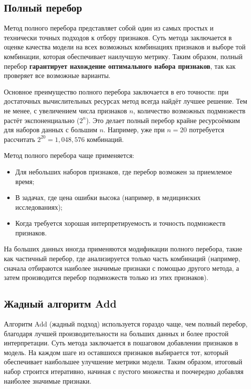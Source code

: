 \subsection{Полный перебор}

Метод полного перебора представляет собой один из самых простых и технически точных подходов к отбору признаков. Суть метода заключается в оценке качества модели на всех возможных комбинациях признаков и выборе той комбинации, которая обеспечивает наилучшую метрику. Таким образом, полный перебор \textbf{гарантирует нахождение оптимального набора признаков}, так как проверяет все возможные варианты.

Основное преимущество полного перебора заключается в его точности: при достаточных вычислительных ресурсах метод всегда найдёт лучшее решение. Тем не менее, с увеличением числа признаков $n$, количество возможных подмножеств растёт экспоненциально ($2^n$). Это делает полный перебор крайне ресурсоёмким для наборов данных с большим $n$. Например, уже при $n=20$ потребуется рассчитать $2^{20} = 1,048,576$ комбинаций.

Метод полного перебора чаще применяется:
\begin{itemize}
    \item Для небольших наборов признаков, где перебор возможен за приемлемое время;
    \item В задачах, где цена ошибки высока (например, в медицинских исследованиях);
    \item Когда требуется хорошая интерпретируемость и точность подмножеств признаков.
\end{itemize}

На больших данных иногда применяются модификации полного перебора, такие как частичный перебор, где анализируется только часть комбинаций (например, сначала отбираются наиболее значимые признаки с помощью другого метода, а затем производится перебор подмножеств только из этих признаков).

\subsection{Жадный алгоритм Add}

Алгоритм Add (жадный подход) используется гораздо чаще, чем полный перебор, благодаря лучшей производительности на больших данных и более простой интерпретации. Суть метода заключается в пошаговом добавлении признаков в модель. На каждом шаге из оставшихся признаков выбирается тот, который обеспечивает наибольшее улучшение метрики модели. Таким образом, итоговый набор строится итеративно, начиная с пустого множества и поочередно добавляя наиболее значимые признаки.

